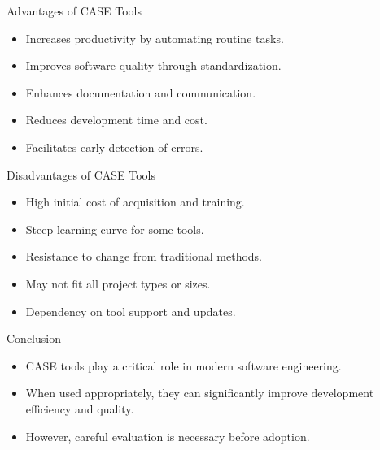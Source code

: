 \documentclass[14pt, aspectratio=1610]{beamer}
\begin{document}
\begin{frame}{Advantages of CASE Tools}
	\begin{itemize}
		\item<1-> Increases productivity by automating routine tasks. \pause
		\item<2-> Improves software quality through standardization. \pause
		\item<3-> Enhances documentation and communication. \pause
		\item<4-> Reduces development time and cost. \pause
		\item<5-> Facilitates early detection of errors.
	\end{itemize}
\end{frame}

\begin{frame}{Disadvantages of CASE Tools}
	\begin{itemize}
		\item<1-> High initial cost of acquisition and training. \pause
		\item<2-> Steep learning curve for some tools. \pause
		\item<3-> Resistance to change from traditional methods. \pause
		\item<4-> May not fit all project types or sizes. \pause
		\item<5-> Dependency on tool support and updates.
	\end{itemize}
\end{frame}

\begin{frame}{Conclusion}
	\begin{itemize}
		\item<1-> CASE tools play a critical role in modern software engineering. \pause
		\item<2-> When used appropriately, they can significantly improve development efficiency and quality. \pause
		\item<3-> However, careful evaluation is necessary before adoption.
	\end{itemize}
\end{frame}
\end{document}
